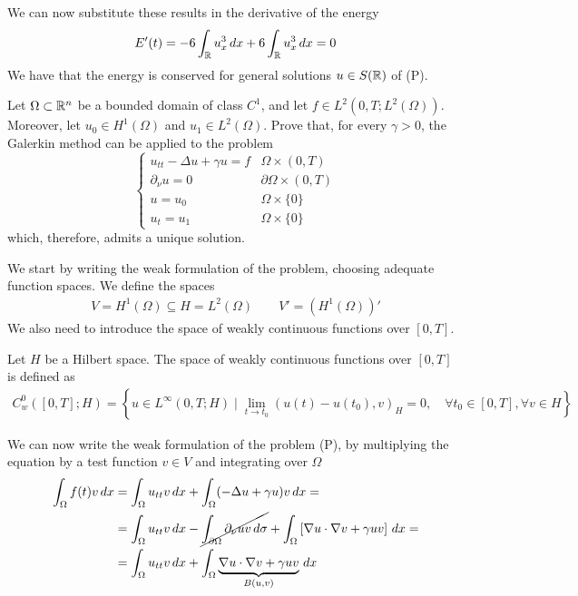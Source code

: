 We can now substitute these results in the derivative of the energy
\[
    \begin{split}
        E'(t) = - 6 \int_{\mathbb{R}} u_x^3 \, dx + 6 \int_{\mathbb{R}} u_x^3 \, dx = 0
    \end{split}
\]
We have that the energy is conserved for general solutions \(u \in S(\mathbb{R})\)
of (P).

\newpage
\begin{exercise}
    Let \(\Omega \subset \mathbb{R}^n\) be a bounded domain of class \(C^1\), and let \(f \in L^2(0, T; L^2(\Omega))\). Moreover, let \(u_0 \in H^1(\Omega)\) and \(u_1 \in L^2(\Omega)\). Prove that, for every \(\gamma > 0\), the Galerkin method can be applied to the problem
    \[
        \begin{cases}
            u_{tt} - \Delta u + \gamma u = f & \Omega \times (0, T)         \\
            \partial_\nu u = 0               & \partial\Omega \times (0, T) \\
            u = u_0                          & \Omega \times \{0\}          \\
            u_t = u_1                        & \Omega \times \{0\}
        \end{cases}
        \tag*{(P)}
    \]
    which, therefore, admits a unique solution.
\end{exercise}
We start by writing the weak formulation of the problem, choosing adequate function spaces. We define the spaces
\[
    \begin{split}
        V = H^1(\Omega) \subseteq H = L^2(\Omega) \qquad V' = \left(H^1(\Omega)\right)'
    \end{split}
\]
We also need to introduce the space of weakly continuous functions over \([0,
        T]\).
\begin{remark}
    Let \(H\) be a Hilbert space. The space of weakly continuous functions over \([0, T]\) is defined as
    \[
        \begin{split}
            C_w^0([0, T]; H) = \left\{ u \in L^\infty(0, T; H) \mid \lim_{t \to t_0} (u(t) - u(t_0), v)_H = 0, \quad \forall t_0 \in [0, T], \forall v \in H \right\}
        \end{split}
    \]
\end{remark}
We can now write the weak formulation of the problem (P), by multiplying the equation by a test function \(v \in V\) and integrating over \(\Omega\)
\begin{align*}
    \int_\Omega f(t) v \, dx & = \int_\Omega u_{tt} v \, dx + \int_\Omega (-\Delta u  + \gamma u)v \, dx =                                                                                     \\
                             & = \int_\Omega u_{tt} v \, dx - \cancel{\int_{\partial\Omega} \partial_\nu u v \, d\sigma} + \int_\Omega \left[\nabla u \cdot \nabla v + \gamma u v\right] \, dx = \\
                             & = \int_\Omega u_{tt} v \, dx + \int_\Omega \underbrace{\nabla u \cdot \nabla v + \gamma u v}_{B(u, v)} \, dx
\end{align*}
